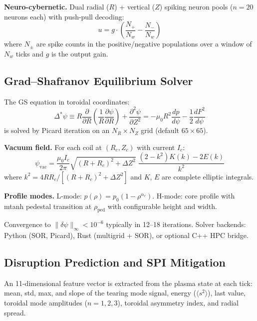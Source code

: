 \documentclass[twocolumn,preprintnumbers,amsmath,amssymb,prl,floatfix]{revtex4-2}
\begin{document}
\textbf{Neuro-cybernetic.}\quad
Dual radial ($R$) + vertical ($Z$) spiking neuron pools
($n = 20$ neurons each) with push-pull decoding:
%
\begin{equation}
  u = g \cdot \left(\frac{N_+}{N_w} - \frac{N_-}{N_w}\right)
\end{equation}
%
where $N_\pm$ are spike counts in the positive/negative
populations over a window of $N_w$ ticks and $g$ is the
output gain.

\subsection{Grad--Shafranov Equilibrium Solver}

The GS equation in toroidal coordinates:
%
\begin{equation}
  \Delta^* \psi \equiv R\frac{\partial}{\partial R}
  \left(\frac{1}{R}\frac{\partial\psi}{\partial R}\right)
  + \frac{\partial^2\psi}{\partial Z^2}
  = -\mu_0 R^2 \frac{dp}{d\psi}
  - \frac{1}{2}\frac{dF^2}{d\psi}
  \label{eq:gs}
\end{equation}
%
is solved by Picard iteration on an $N_R \times N_Z$ grid
(default $65 \times 65$).

\textbf{Vacuum field.}\quad
For each coil at $(R_c, Z_c)$ with current $I_c$:
%
\begin{equation}
  \psi_\mathrm{vac} = \frac{\mu_0 I_c}{2\pi}
  \sqrt{(R+R_c)^2 + \Delta Z^2}\;
  \frac{(2-k^2)K(k) - 2E(k)}{k^2}
\end{equation}
%
where $k^2 = 4RR_c / [(R+R_c)^2 + \Delta Z^2]$ and
$K$, $E$ are complete elliptic integrals.

\textbf{Profile modes.}\quad
L-mode: $p(\rho) = p_0(1 - \rho^{\alpha_c})$.
H-mode: core profile with mtanh pedestal transition at
$\rho_\mathrm{ped}$ with configurable height and width.

Convergence to $\|\delta\psi\|_\infty < 10^{-6}$ typically
in 12--18 iterations.  Solver backends: Python (SOR, Picard),
Rust (multigrid + SOR), or optional C++ HPC bridge.

\subsection{Disruption Prediction and SPI Mitigation}
\label{sec:disruption}

An 11-dimensional feature vector is extracted from the plasma
state at each tick:
mean, std, max, and slope of the tearing mode signal,
energy ($\langle s^2 \rangle$), last value,
toroidal mode amplitudes ($n = 1, 2, 3$),
toroidal asymmetry index, and radial spread.
\end{document}
